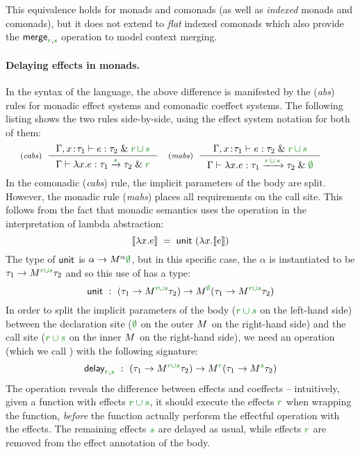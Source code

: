 \noindent
This equivalence holds for monads and comonads (as well as \emph{indexed} monads
and comonads), but it does not extend to \emph{flat} indexed comonads which also provide
the $\ident{merge}_{\cclrd{r}, \cclrd{s}}$ operation to model context merging.

\paragraph{Delaying effects in monads.} 
In the syntax of the language, the above difference is manifested by the (\emph{abs}) rules for 
monadic effect systems and comonadic coeffect systems. The following listing shows the two rules 
side-by-side, using the effect system notation for both of them:
%
\begin{equation*}
\tyrule{cabs}
  { \Gamma, x\!:\!\tau_1 \vdash e : \tau_2 \;\&\; \cclrd{r}\,\cclrd{\cup}\,\cclrd{s} }
  { \Gamma \vdash \lambda x.e : \tau_1 \xrightarrow{\cclrd{s}} \tau_2 \;\&\; \cclrd{r}}
\quad
\tyrule{mabs}
  { \Gamma, x\!:\!\tau_1 \vdash e : \tau_2 \;\&\; \cclrd{r}\,\cclrd{\cup}\,\cclrd{s}}
  { \Gamma \vdash \lambda x.e : \tau_1 \xrightarrow{\cclrd{r}\,\cclrd{\cup}\,\cclrd{s}} \tau_2 \;\&\; \cclrd{\emptyset} }
\qquad
\end{equation*}
%
In the comonadic (\emph{cabs}) rule, the implicit parameters of the body are split. However,
the monadic rule (\emph{mabs}) places all requirements on the call site. This follows from the
fact that monadic semantics uses the  operation in the interpretation of lambda abstraction:
%
\begin{equation*}
\sem{\lambda x.e} \;=\; \ident{unit}~(\lambda x. \sem{e})
\end{equation*}
%
The type of $\textnormal{\sffamily unit}$ is $\alpha\rightarrow\mtyp{\alpha}{\cclrd{\emptyset}}$, but in this specific
case, the $\alpha$ is instantiated to be $\tau_1\rightarrow\mtyp{\cclrd{r \cup s}}{\tau_2}$ and so this
use of  has a type:
%
\begin{equation*}
\ident{unit}~:~(\tau_1\rightarrow\mtyp{\cclrd{r \cup s}}{\tau_2}) \rightarrow \mtyp{\cclrd{\emptyset}}(\tau_1\rightarrow\mtyp{\cclrd{r \cup s}}{\tau_2})
\end{equation*}
%
In order to split the implicit parameters of the body ($\cclrd{r \cup s}$ on the left-hand side) between 
the declaration site ($\cclrd{\emptyset}$ on the outer $\mtyp{}$ on the right-hand side) and the 
call site ($\cclrd{r \cup s}$ on the inner $\mtyp{}$ on the right-hand side), we need an operation
(which we call ) with the following signature:
%
\begin{equation*}
\ident{delay}_{\cclrd{r}, \cclrd{s}}~:~(\tau_1\rightarrow\mtyp{\cclrd{r \cup s}}{\tau_2}) \rightarrow \mtyp{\cclrd{r}}(\tau_1\rightarrow\mtyp{\cclrd{s}}{\tau_2})
\end{equation*}
%
The operation reveals the difference between effects and coeffects -- intuitively, given a function
with effects $\cclrd{r \cup s}$, it should execute the effects $\cclrd{r}$ when wrapping the 
function, \emph{before} the function actually perforsm the effectful operation with the effects.
The remaining effects $\cclrd{s}$ are delayed as usual, while effects $\cclrd{r}$ are removed
from the effect annotation of the body.

